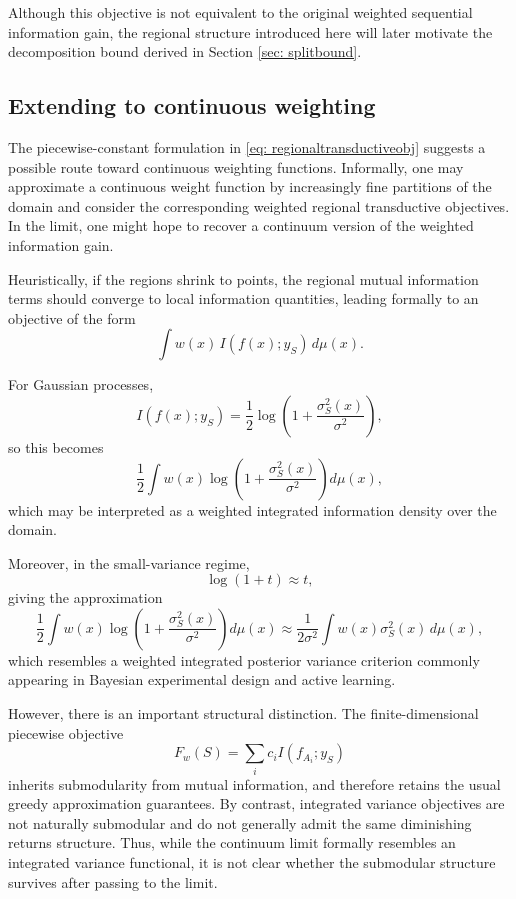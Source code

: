 Although this objective is not equivalent to the original weighted sequential information gain, the regional structure introduced here will later motivate the decomposition bound derived in Section \ref{sec: splitbound}.
\subsection{Extending to continuous weighting}

The piecewise-constant formulation in \eqref{eq: regionaltransductiveobj} suggests a possible route toward continuous weighting functions. Informally, one may approximate a continuous weight function by increasingly fine partitions of the domain and consider the corresponding weighted regional transductive objectives. In the limit, one might hope to recover a continuum version of the weighted information gain.

Heuristically, if the regions shrink to points, the regional mutual information terms should converge to local information quantities, leading formally to an objective of the form
\begin{equation*}
\int
w(x)\,
I(f(x);y_S)\,
d\mu(x).
\end{equation*}

For Gaussian processes,
\begin{equation*}
I(f(x);y_S)
=
\frac12
\log\!\left(
1+\frac{\sigma_S^2(x)}{\sigma^2}
\right),
\end{equation*}
so this becomes
\begin{equation*}
\frac12
\int
w(x)
\log\!\left(
1+\frac{\sigma_S^2(x)}{\sigma^2}
\right)
d\mu(x),
\end{equation*}
which may be interpreted as a weighted integrated information density over the domain.

Moreover, in the small-variance regime,
\begin{equation*}
\log(1+t)\approx t,
\end{equation*}
giving the approximation
\begin{equation*}
\frac12
\int
w(x)
\log\!\left(
1+\frac{\sigma_S^2(x)}{\sigma^2}
\right)
d\mu(x)
\approx
\frac1{2\sigma^2}
\int
w(x)\sigma_S^2(x)\,d\mu(x),
\end{equation*}
which resembles a weighted integrated posterior variance criterion commonly appearing in Bayesian experimental design and active learning.

However, there is an important structural distinction. The finite-dimensional piecewise objective
\begin{equation*}
F_w(S)
=
\sum_i
c_i I(f_{A_i};y_S)
\end{equation*}
inherits submodularity from mutual information, and therefore retains the usual greedy approximation guarantees. By contrast, integrated variance objectives are not naturally submodular and do not generally admit the same diminishing returns structure.
Thus, while the continuum limit formally resembles an integrated variance functional, it is not clear whether the submodular structure survives after passing to the limit.

